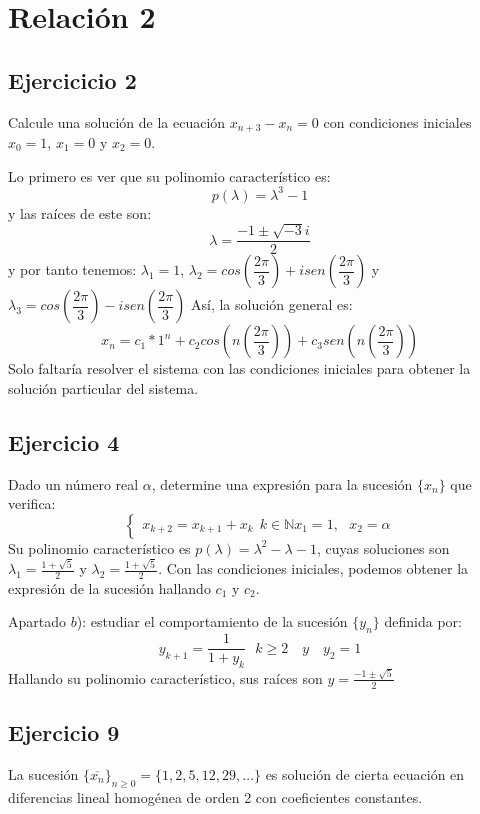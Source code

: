 \documentclass[11pt, a4paper, titlepage]{article}
\theoremstyle{theorem-style}
\theoremstyle{definition-style}
\theoremstyle{remark-style}
\theoremstyle{example-style}
\begin{document}
\section{Relación 2}

\subsection{Ejercicicio 2}
Calcule una solución de la ecuación $x_ {n+3} -x_n = 0$ con condiciones iniciales $x_0 = 1$, $x_1 = 0$ y $x_2 = 0$.

Lo primero es ver que su polinomio característico es:
\[
p(\lambda) = \lambda^3 -1
\]
y las raíces de este son:
\[
\lambda = \frac{-1 \pm \sqrt{-3}i}{2}
\]
y por tanto tenemos: $\lambda_1 = 1$, $\lambda_2 = cos(\dfrac{2\pi}{3})+ i sen(\dfrac{2\pi}{3})$ y $\lambda_3 = cos(\dfrac{2\pi}{3}) - i sen(\dfrac{2\pi}{3})$
Así, la solución general es:
\[
x_n = c_1 * 1^n + c_2 cos(n(\dfrac{2\pi}{3})) + c_3 sen(n(\dfrac{2\pi}{3}))
\]
Solo faltaría resolver el sistema con las condiciones iniciales para obtener la solución particular del sistema.


\subsection{Ejercicio 4}
Dado un número real $\alpha$, determine una expresión para la sucesión $\{x_n\}$ que verifica:
\[
\begin{cases}
	x_{k+2} = x _{k+1} + x_k \ \ k \in \mathbb N
	x_1 = 1, \ \ \ x_2 = \alpha
\end{cases}
\]
Su polinomio característico es $p(\lambda) = \lambda^2 - \lambda - 1$, cuyas soluciones son $\lambda_1 = \frac{1+\sqrt 5}{2}$ y $\lambda_2 = \frac{1+ \sqrt 5}{2}$. Con las condiciones iniciales, podemos obtener la expresión de la sucesión hallando $c_1$ y $c_2$.

Apartado $b$): estudiar el comportamiento de la sucesión $\{y_n\}$ definida por:
\[
y_{k+1} = \frac{1}{1+y_k} \ \ \ k \geq 2 \quad y \quad y_2 = 1
\]
Hallando su polinomio característico, sus raíces son $y = \frac{-1 \pm \sqrt 5}{2}$

\subsection{Ejercicio 9}

La sucesión $\{\overline{x_n}\}_{n\ge0} = \{1, 2, 5, 12, 29, \dots\}$ es solución de cierta ecuación en diferencias lineal homogénea de orden 2 con coeficientes constantes.\\
\end{document}
